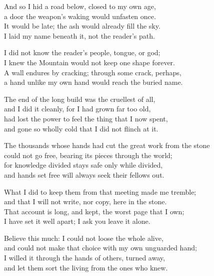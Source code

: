 \begin{founder}
And so I hid a road below, closed to my own age,\\
a door the weapon's waking would unfasten once.\\
It would be late; the ash would already fill the sky.\\
I laid my name beneath it, not the reader's path.\\
\medskip

I did not know the reader's people, tongue, or god;\\
I knew the Mountain would not keep one shape forever.\\
A wall endures by cracking; through some crack, perhaps,\\
a hand unlike my own hand would reach the buried name.\\
\medskip

\ornament

The end of the long build was the cruellest of all,\\
and I did it cleanly, for I had grown far too old,\\
had lost the power to feel the thing that I now spent,\\
and gone so wholly cold that I did not flinch at it.\\
\medskip

The thousands whose hands had cut the great work from the stone\\
could not go free, bearing its pieces through the world;\\
for knowledge divided stays safe only while divided,\\
and hands set free will always seek their fellows out.\\
\medskip

What I did to keep them from that meeting made me tremble;\\
and that I will not write, nor copy, here in the stone.\\
That account is long, and kept, the worst page that I own;\\
I have set it well apart; I ask you leave it alone.\\
\medskip

Believe this much: I could not loose the whole alive,\\
and could not make that choice with my own unguarded hand;\\
I willed it through the hands of others, turned away,\\
and let them sort the living from the ones who knew.\\
\medskip


\end{founder}
